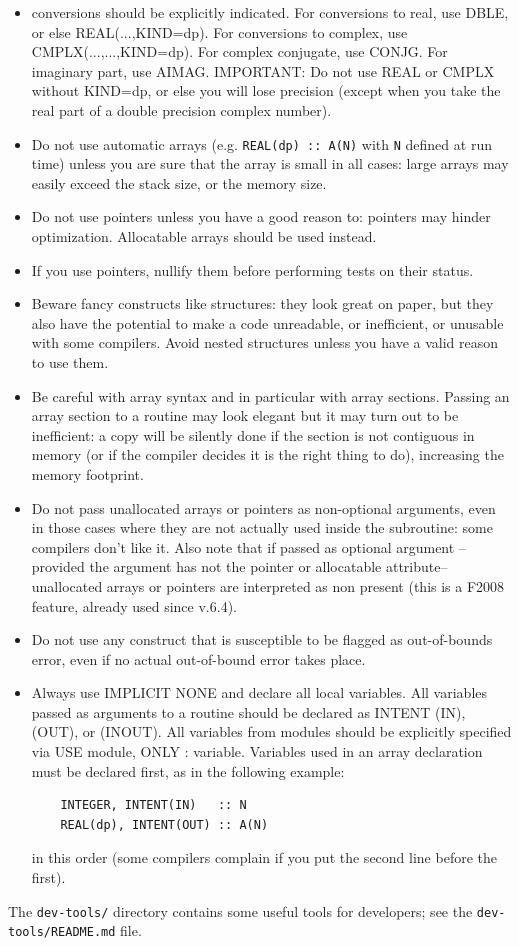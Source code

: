 \documentclass[12pt,a4paper]{article}
\begin{document}
\begin{itemize}
\item conversions should be explicitly indicated. For conversions to real,
use DBLE, or else REAL(...,KIND=dp). For conversions to complex, use
CMPLX(...,...,KIND=dp). For complex conjugate, use CONJG.  For imaginary part,
use AIMAG.  IMPORTANT: Do not use REAL or CMPLX without KIND=dp, or else you
will lose precision (except when you take the real part of a
double precision complex number).
\item Do not use automatic arrays (e.g. \texttt{REAL(dp) :: A(N)} with
\texttt{N} defined at run time) unless you are sure that the array is
small in all cases: large arrays may easily exceed the stack size,
or the memory size.
\item Do not use pointers unless you have a good reason to:
pointers may hinder optimization. Allocatable arrays should be used instead.
\item If you use pointers, nullify them before performing tests on their
status.
\item Beware fancy constructs like structures: they look great on paper,
but they also have the potential to make a code unreadable, or inefficient,
or unusable with some compilers. Avoid nested structures unless you have a
valid reason to use them.
\item Be careful with array syntax and in particular with
array sections. Passing an array section to a routine may look elegant
but it may turn out to be inefficient: a copy will be silently done
if the section is not contiguous in memory (or if the compiler
decides it is the right thing to do), increasing the memory footprint.
\item Do not pass unallocated arrays or pointers as non-optional arguments, 
even in those cases where they are not actually used inside the subroutine: 
some compilers don't like it. Also note that if passed as optional argument 
--provided the argument has not the pointer or allocatable attribute-- 
unallocated arrays or pointers are interpreted as non present (this is a
F2008 feature, already used since v.6.4).
\item Do not use any construct that is susceptible to be flagged as
out-of-bounds error, even if no actual out-of-bound error takes place.
\item Always use IMPLICIT NONE and declare all local variables.
All variables passed as arguments to a routine should be declared as
INTENT (IN), (OUT), or (INOUT). All variables from modules should be
explicitly specified via USE module, ONLY : variable. Variables used
in an array declaration must be declared first, as in the following
example:
\begin{verbatim}
    INTEGER, INTENT(IN)   :: N
    REAL(dp), INTENT(OUT) :: A(N)
\end{verbatim}
in this order (some compilers complain if you put the second line
before the first).
\end{itemize}
The \texttt{dev-tools/} directory contains some useful tools for developers;
see the \texttt{dev-tools/README.md} file.
\end{document}
